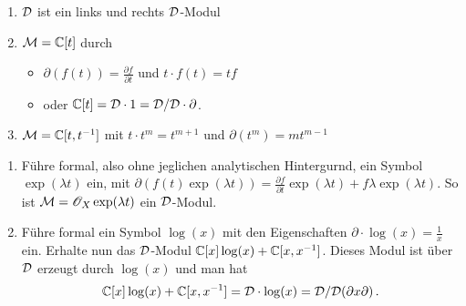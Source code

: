 \begin{exmp}
\cite[Exmp 2.2]{ArkhipovDmod}
\begin{enumerate}
\item $\mathcal{D}$ ist ein links und rechts $\mathcal{D}$-Modul
\item $\mathcal{M}=\mathbb{C}[t]$ durch
\begin{itemize}
\item $\partial(f(t))=\frac{\partial f}{\partial t}$ und
$t\cdot f(t)=tf$
\item oder \cite[Exmp 3.1.2]{ginzburg} $\mathbb{C}[t]=\mathcal{D}\cdot1=\mathcal{D}/\mathcal{D}\cdot\partial$.
\end{itemize}
\item $\mathcal{M}=\mathbb{C}[t,t^{-1}]$ mit $t\cdot t^{m}=t^{m+1}$ und
$\partial(t^m)=mt^{m-1}$
\end{enumerate}
\end{exmp}
\begin{exmp} 
\begin{enumerate}
\item \cite[Exmp 2.2]{ArkhipovDmod}
Führe formal, also ohne jeglichen analytischen Hintergurnd, ein Symbol
$\exp(\lambda t)$ ein, mit $\partial(f(t)\exp(\lambda t))=\frac{\partial
f}{\partial t}\exp(\lambda t)+f\lambda\exp(\lambda t)$.  So ist
$\mathcal{M}=\mathscr{O}_X\exp(\lambda t)$ ein $\mathcal{D}$-Modul.
\item \cite[Exmp 3.1.4]{ginzburg}
Führe formal ein Symbol $\log(x)$ mit den Eigenschaften
$\partial\cdot\log(x)=\frac{1}{x}$ ein. Erhalte nun das $\mathcal{D}$-Modul
$\mathbb{C}[x]\log(x)+\mathbb{C}[x,x^{-1}]$. Dieses Modul ist über $\mathcal{D}$ erzeugt durch
$\log(x)$ und man hat
\[
\mathbb{C}[x]\log(x)+\mathbb{C}[x,x^{-1}]=\mathcal{D}\cdot\log(x)=\mathcal{D}\slash\mathcal{D}(\partial x\partial) \,.
\]
\end{enumerate}
\end{exmp}

\begin{comment}
\section{Lokalisierung von $\Ckx$-Moduln}
\cite[Chap 4.1.]{sabbah_cimpa90}
Sei $M$ ein $\Ckx$-Modul. Wir schreiben $M[x^{-1}]$ für den $K$-Vektor Raum
$M\otimes_{\Ckx}K$. Im allgemeinen gilt, falls $M$ von andlichen Typ über
$\Ckx$ ist, so ist $C[x^{-1}]$ von endlichem Typ über $K$. Bemerke aber, dass
$M[x^{-1}]$ generell nicht von endlichem Typ über $\Ckx$ ist.
\end{comment}

